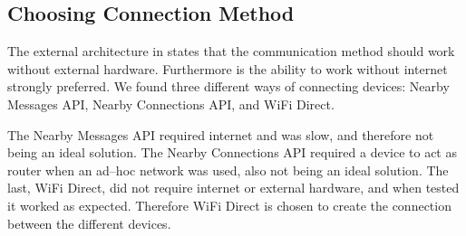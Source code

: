 \subsection{Choosing Connection Method}
The external architecture in  states that the communication method should work without external hardware.
Furthermore is the ability to work without internet strongly preferred.
We found three different ways of connecting devices: Nearby Messages API, Nearby Connections API, and WiFi Direct.

The Nearby Messages API required internet and was slow, and therefore not being an ideal solution.
The Nearby Connections API required a device to act as router when an ad--hoc network was used, also not being an ideal solution.
The last, WiFi Direct, did not require internet or external hardware, and when tested it worked as expected.
Therefore WiFi Direct is chosen to create the connection between the different devices.
